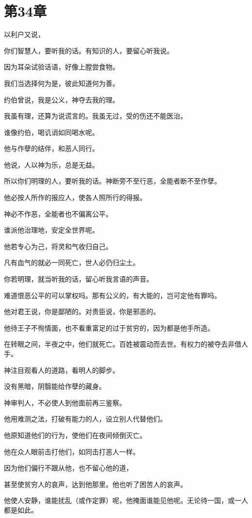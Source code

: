 \documentclass[12pt,oneside]{book}
\begin{document}
\chapter{第34章}
以利户又说，

你们智慧人，要听我的话。有知识的人，要留心听我说。

因为耳朵试验话语，好像上膛尝食物。

我们当选择何为是，彼此知道何为善。

约伯曾说，我是公义，神夺去我的理。

我虽有理，还算为说谎言的。我虽无过，受的伤还不能医治。

谁像约伯，喝讥诮如同喝水呢。

他与作孽的结伴，和恶人同行。

他说，人以神为乐，总是无益。

所以你们明理的人，要听我的话。神断旁不至行恶，全能者断不至作孽。

他必按人所作的报应人，使各人照所行的得报。

神必不作恶，全能者也不偏离公平。

谁派他治理地，安定全世界呢。

他若专心为己，将灵和气收归自己。

凡有血气的就必一同死亡，世人必仍归尘土。

你若明理，就当听我的话，留心听我言语的声音。

难道恨恶公平的可以掌权吗。那有公义的，有大能的，岂可定他有罪吗。

他对君王说，你是鄙陋的。对贵臣说，你是邪恶的。

他待王子不徇情面，也不看重富足的过于贫穷的，因为都是他手所造。

在转眼之间，半夜之中，他们就死亡。百姓被震动而去世。有权力的被夺去非借人手。

神注目观看人的道路，看明人的脚步。

没有黑暗，阴翳能给作孽的藏身。

神审判人，不必使人到他面前再三鉴察。

他用难测之法，打破有能力的人，设立别人代替他们。

他原知道他们的行为，使他们在夜间倾倒灭亡。

他在众人眼前击打他们，如同击打恶人一样。

因为他们偏行不跟从他，也不留心他的道，

甚至使贫穷人的哀声，达到他那里。他也听了困苦人的哀声。

他使人安静，谁能扰乱（或作定罪）呢，他掩面谁能见他呢。无论待一国，或一人都是如此。
\end{document}
